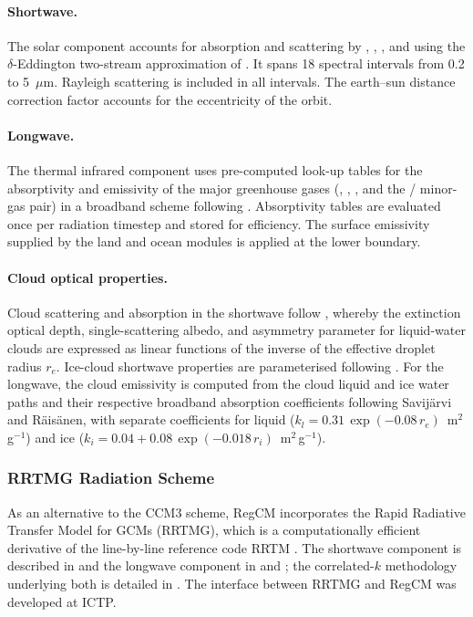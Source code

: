 \paragraph{Shortwave.}
The solar component accounts for absorption and scattering by ,
, , and  using the $\delta$-Eddington
two-stream approximation of \cite{Kiehl_96}.  It spans 18 spectral
intervals from 0.2 to 5~$\mu$m.  Rayleigh scattering is included in all
intervals.  The earth--sun distance correction factor accounts for the
eccentricity of the orbit.

\paragraph{Longwave.}
The thermal infrared component uses pre-computed look-up tables for the
absorptivity and emissivity of the major greenhouse gases (,
, , and the / minor-gas pair) in a
broadband scheme following \cite{Kiehl_96}.  Absorptivity tables are
evaluated once per radiation timestep and stored for efficiency.  The
surface emissivity supplied by the land and ocean modules is applied at the
lower boundary.

\paragraph{Cloud optical properties.}
Cloud scattering and absorption in the shortwave follow \cite{Slingo_89},
whereby the extinction optical depth, single-scattering albedo, and
asymmetry parameter for liquid-water clouds are expressed as linear
functions of the inverse of the effective droplet radius $r_e$.
Ice-cloud shortwave properties are parameterised following \cite{Ebert_92}.
For the longwave, the cloud emissivity is computed from the cloud liquid and
ice water paths and their respective broadband absorption coefficients
following Savij{\"a}rvi and R{\"a}is{\"a}nen, with separate coefficients for
liquid ($k_l = 0.31\,\exp(-0.08\,r_e)$~m$^2$\,g$^{-1}$) and ice
($k_i = 0.04 + 0.08\,\exp(-0.018\,r_i)$~m$^2$\,g$^{-1}$).

\subsubsection{RRTMG Radiation Scheme}

As an alternative to the CCM3 scheme, RegCM incorporates the Rapid Radiative
Transfer Model for GCMs (RRTMG), which is a computationally efficient
derivative of the line-by-line reference code RRTM \citep{Mlawer_97}.  The
shortwave component is described in \cite{Iacono_08} and the longwave
component in \cite{Mlawer_97} and \cite{Iacono_08}; the correlated-$k$
methodology underlying both is detailed in \cite{Clough_05}.  The interface
between RRTMG and RegCM was developed at ICTP.


